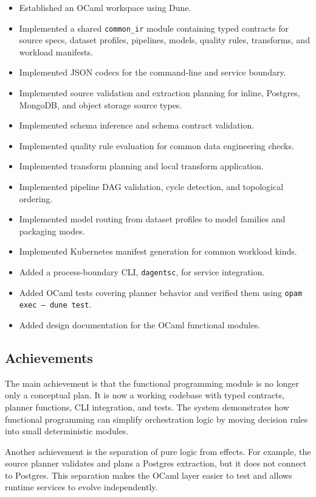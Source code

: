 \documentclass[conference]{IEEEtran}
\begin{document}
\begin{itemize}
  \item Established an OCaml workspace using Dune.
  \item Implemented a shared \texttt{common\_ir} module containing typed
  contracts for source specs, dataset profiles, pipelines, models, quality
  rules, transforms, and workload manifests.
  \item Implemented JSON codecs for the command-line and service boundary.
  \item Implemented source validation and extraction planning for inline,
  Postgres, MongoDB, and object storage source types.
  \item Implemented schema inference and schema contract validation.
  \item Implemented quality rule evaluation for common data engineering checks.
  \item Implemented transform planning and local transform application.
  \item Implemented pipeline DAG validation, cycle detection, and topological
  ordering.
  \item Implemented model routing from dataset profiles to model families and
  packaging modes.
  \item Implemented Kubernetes manifest generation for common workload kinds.
  \item Added a process-boundary CLI, \texttt{dagentsc}, for service
  integration.
  \item Added OCaml tests covering planner behavior and verified them using
  \texttt{opam exec -- dune test}.
  \item Added design documentation for the OCaml functional modules.
\end{itemize}

\subsection{Achievements}

The main achievement is that the functional programming module is no longer
only a conceptual plan. It is now a working codebase with typed contracts,
planner functions, CLI integration, and tests. The system demonstrates how
functional programming can simplify orchestration logic by moving decision
rules into small deterministic modules.

Another achievement is the separation of pure logic from effects. For example,
the source planner validates and plans a Postgres extraction, but it does not
connect to Postgres. This separation makes the OCaml layer easier to test and
allows runtime services to evolve independently.
\end{document}
